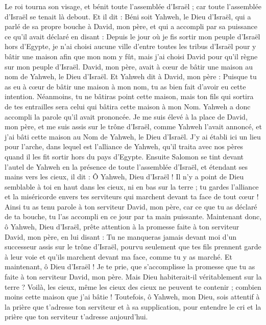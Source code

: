 \begin{multicols}{2}
Le roi tourna son visage, et bénit toute l'assemblée d'Israël ; car toute l'assemblée d'Israël se tenait là debout.
Et il dit : Béni soit Yahweh, le Dieu d'Israël, qui a parlé de sa propre bouche à David, mon père, et qui a accompli par sa puissance ce qu’il avait déclaré en disant :
Depuis le jour où je fis sortir mon peuple d'Israël hors d'Egypte, je n'ai choisi aucune ville d'entre toutes les tribus d'Israël pour y bâtir une maison afin que mon nom y fût, mais j'ai choisi David pour qu’il règne sur mon peuple d'Israël.
David, mon père, avait à cœur de bâtir une maison au nom de Yahweh, le Dieu d'Israël.
Et Yahweh dit à David, mon père : Puisque tu as eu à cœur de bâtir une maison à mon nom, tu as bien fait d’avoir eu cette intention.
Néanmoins, tu ne bâtiras point cette maison, mais ton fils qui sortira de tes entrailles sera celui qui bâtira cette maison à mon Nom.
Yahweh a donc accompli la parole qu'il avait prononcée. Je me suis élevé à la place de David, mon père, et me suis assis sur le trône d'Israël, comme Yahweh l’avait annoncé, et j'ai bâti cette maison au Nom de Yahweh, le Dieu d'Israël.
J'y ai établi ici un lieu pour l'arche, dans lequel est l'alliance de Yahweh, qu'il traita avec nos pères quand il les fit sortir hors du pays d'Egypte.
Ensuite Salomon se tint devant l'autel de Yahweh en la présence de toute l'assemblée d'Israël, et étendant ses mains vers les cieux,
il dit : Ô Yahweh, Dieu d'Israël ! Il n'y a point de Dieu semblable à toi en haut dans les cieux, ni en bas sur la terre ; tu gardes l'alliance et la miséricorde envers tes serviteurs qui marchent devant ta face de tout cœur !
Ainsi tu as tenu parole à ton serviteur David, mon père, car ce que tu as déclaré de ta bouche, tu l'as accompli en ce jour par ta main puissante.
Maintenant donc, ô Yahweh, Dieu d'Israël, prête attention à la promesse faite à ton serviteur David, mon père, en lui disant : Tu ne manqueras jamais devant moi d’un successeur assis sur le trône d'Israël, pourvu seulement que tes fils prennent garde à leur voie et qu’ils marchent devant ma face, comme tu y as marché.
Et maintenant, ô Dieu d'Israël ! Je te prie, que s’accomplisse la promesse que tu as faite à ton serviteur David, mon père.
Mais Dieu habiterait-il véritablement sur la terre ? Voilà, les cieux, même les cieux des cieux ne peuvent te contenir ; combien moins cette maison que j'ai bâtie !
Toutefois, ô Yahweh, mon Dieu, sois attentif à la prière que t’adresse ton serviteur et à sa supplication, pour entendre le cri et la prière que ton serviteur t’adresse aujourd'hui.

\end{multicols}
